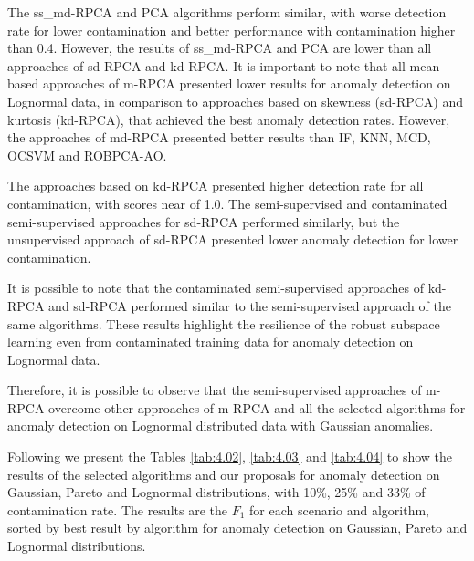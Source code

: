 The ss\_md-RPCA and PCA algorithms perform similar, with worse detection rate for lower contamination and better performance with contamination higher than 0.4. However, the results of ss\_md-RPCA and PCA are lower than all approaches of sd-RPCA and kd-RPCA. It is important to note that all mean-based approaches of m-RPCA presented lower results for anomaly detection on Lognormal data, in comparison to approaches based on skewness (sd-RPCA) and kurtosis (kd-RPCA), that achieved the best anomaly detection rates. However, the approaches of md-RPCA presented better results than IF, KNN, MCD, OCSVM and ROBPCA-AO.

The approaches based on kd-RPCA presented higher detection rate for all contamination, with scores near of 1.0. The semi-supervised and contaminated semi-supervised approaches for sd-RPCA performed similarly, but the unsupervised approach of sd-RPCA presented lower anomaly detection for lower contamination.

It is possible to note that the contaminated semi-supervised approaches of kd-RPCA and sd-RPCA performed similar to the semi-supervised approach of the same algorithms. These results highlight the resilience of the robust subspace learning even from contaminated training data for anomaly detection on Lognormal data.

Therefore, it is possible to observe that the semi-supervised approaches of m-RPCA overcome other approaches of m-RPCA and all the selected algorithms for anomaly detection on Lognormal distributed data with Gaussian anomalies. 

Following we present the Tables \ref{tab:4.02}, \ref{tab:4.03} and \ref{tab:4.04} to show the results of the selected algorithms and our proposals for anomaly detection on Gaussian, Pareto and Lognormal distributions, with 10\%, 25\% and 33\% of contamination rate. The results are the $F_1$ for each scenario and algorithm, sorted by best result by algorithm for anomaly detection on Gaussian, Pareto and Lognormal distributions.

